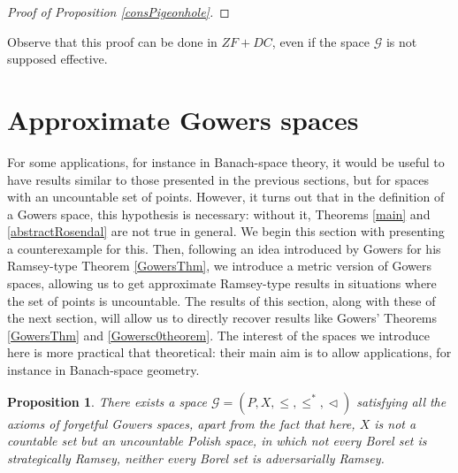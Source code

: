 \documentclass[a4paper,11pt]{article}
\newtheorem{prop}[thm]{Proposition}
\theoremstyle{definition}
\numberwithin{equation}{section}
\newcommand{\G}{\mathcal{G}}
\begin{document}
\begin{proof}[Proof of Proposition \ref{consPigeonhole}]
\end{proof}

Observe that this proof can be done in $ZF + DC$, even if the space $\G$ is not supposed effective.











\bigskip\bigskip

\section{Approximate Gowers spaces}\label{par4}

For some applications, for instance in Banach-space theory, it would be useful to have results similar to those presented in the previous sections, but for spaces with an uncountable set of points. However, it turns out that in the definition of a Gowers space, this hypothesis is necessary: without it, Theorems \ref{main} and \ref{abstractRosendal} are not true in general. We begin this section with presenting a counterexample for this. Then, following an idea introduced by Gowers for his Ramsey-type Theorem  \ref{GowersThm}, we introduce a metric version of Gowers spaces, allowing us to get approximate Ramsey-type results in situations where the set of points is uncountable. The results of this section, along with these of the next section, will allow us to directly recover results like Gowers' Theorems \ref{GowersThm} and \ref{Gowersc0theorem}. The interest of the spaces we introduce here is more practical that theoretical: their main aim is to allow applications, for instance in Banach-space geometry.

\begin{prop}

There exists a space $\G = (P, X, \leqslant, \leqslant^*, \vartriangleleft)$ satisfying all the axioms of forgetful Gowers spaces, apart from the fact that here, $X$ is not a countable set but an uncountable Polish space, in which not every Borel set is strategically Ramsey, neither every Borel set is adversarially Ramsey.

\end{prop}
\end{document}
